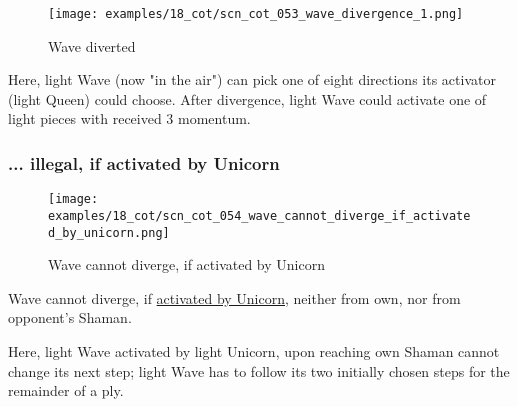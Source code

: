 \clearpage %

\vspace*{-2.1\baselineskip}
\noindent
\begin{figure}[!h]
\texttt{[image: examples/18\_cot/scn\_cot\_053\_wave\_divergence\_1.png]}
\vspace*{-1.3\baselineskip}
\caption{Wave diverted}
\label{fig:scn_cot_053_wave_divergence_1}
\end{figure}

\vspace*{-0.4\baselineskip}
Here, light Wave (now "in the air") can pick one of eight directions its activator
(light Queen) could choose. After divergence, light Wave could activate one of light
pieces with received 3 momentum.

\clearpage %

\subsubsection*{... illegal, if activated by Unicorn}
\label{sec:Conquest of Tlalocan/Divergence/... illegal, if activated by Unicorn}

\vspace*{-1.4\baselineskip}
\noindent
\begin{figure}[!h]
\texttt{[image: examples/18\_cot/scn\_cot\_054\_wave\_cannot\_diverge\_if\_activated\_by\_unicorn.png]}
\vspace*{-1.3\baselineskip}
\caption{Wave cannot diverge, if activated by Unicorn}
\label{fig:scn_cot_054_wave_cannot_diverge_if_activated_by_unicorn}
\end{figure}

\vspace*{-0.5\baselineskip}
Wave cannot diverge, if
\hyperref[fig:scn_mv_031_wave_activation_by_unicorn_first_step]{activated by Unicorn},
neither from own, nor from opponent's Shaman.

Here, light Wave activated by light Unicorn, upon reaching own Shaman cannot change
its next step; light Wave has to follow its two initially chosen steps for the
remainder of a ply.

\clearpage %

